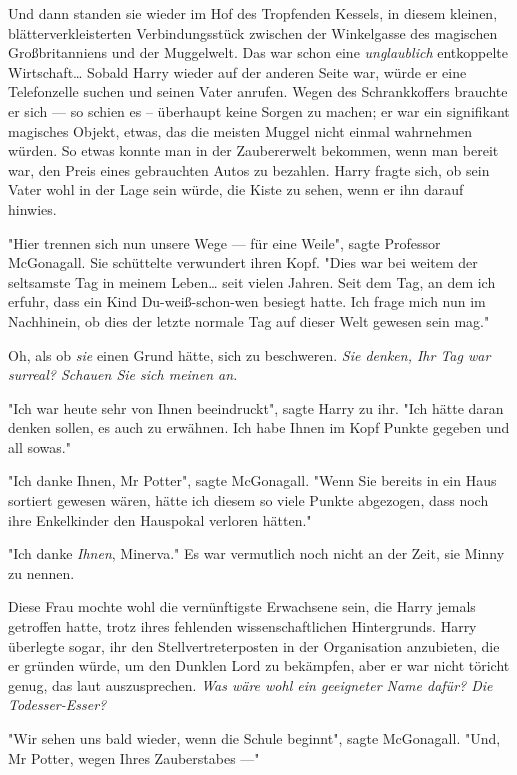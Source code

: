 {Und dann standen sie wieder im Hof des Tropfenden Kessels, in diesem kleinen, blätterverkleisterten Verbindungsstück zwischen der Winkelgasse des magischen Großbritanniens und der Muggelwelt. Das war schon eine \emph{unglaublich} entkoppelte Wirtschaft… Sobald Harry wieder auf der anderen Seite war, würde er eine Telefonzelle suchen und seinen Vater anrufen. Wegen des Schrankkoffers brauchte er sich --- so schien es -- überhaupt keine Sorgen zu machen; er war ein signifikant magisches Objekt, etwas, das die meisten Muggel nicht einmal wahrnehmen würden. So etwas konnte man in der Zaubererwelt bekommen, wenn man bereit war, den Preis eines gebrauchten Autos zu bezahlen. Harry fragte sich, ob sein Vater wohl in der Lage sein würde, die Kiste zu sehen, wenn er ihn darauf hinwies.

"Hier trennen sich nun unsere Wege --- für eine Weile", sagte Professor McGonagall. Sie schüttelte verwundert ihren Kopf. "Dies war bei weitem der seltsamste Tag in meinem Leben… seit vielen Jahren. Seit dem Tag, an dem ich erfuhr, dass ein Kind Du-weiß-schon-wen besiegt hatte. Ich frage mich nun im Nachhinein, ob dies der letzte normale Tag auf dieser Welt gewesen sein mag."

Oh, als ob \emph{sie} einen Grund hätte, sich zu beschweren. \emph{Sie denken, Ihr Tag war surreal? Schauen Sie sich meinen an.}

"Ich war heute sehr von Ihnen beeindruckt", sagte Harry zu ihr. "Ich hätte daran denken sollen, es auch zu erwähnen. Ich habe Ihnen im Kopf Punkte gegeben und all sowas."

"Ich danke Ihnen, Mr Potter", sagte McGonagall. "Wenn Sie bereits in ein Haus sortiert gewesen wären, hätte ich diesem so viele Punkte abgezogen, dass noch ihre Enkelkinder den Hauspokal verloren hätten."

"Ich danke \emph{Ihnen}, Minerva." Es war vermutlich noch nicht an der Zeit, sie Minny zu nennen.

Diese Frau mochte wohl die vernünftigste Erwachsene sein, die Harry jemals getroffen hatte, trotz ihres fehlenden wissenschaftlichen Hintergrunds. Harry überlegte sogar, ihr den Stellvertreterposten in der Organisation anzubieten, die er gründen würde, um den Dunklen Lord zu bekämpfen, aber er war nicht töricht genug, das laut auszusprechen. \emph{Was wäre wohl ein geeigneter Name dafür? Die Todesser-Esser?}

"Wir sehen uns bald wieder, wenn die Schule beginnt", sagte McGonagall. "Und, Mr Potter, wegen Ihres Zauberstabes ---"

}
